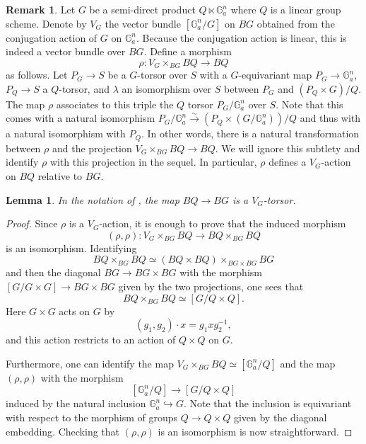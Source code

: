 \documentclass[12pt]{amsart}
\newcommand\Ga{\mathbb{G}_a}
\newtheorem{Lemma}[theorem]{Lemma}
\theoremstyle{definition}
\newtheorem{Rmk}[theorem]{Remark}
\begin{document}
\begin{Rmk}\label{rem: V-torsor for semidirect product}
    Let $G$ be a semi-direct product $Q\ltimes\Ga^n$ where $Q$ is a linear group scheme.
    Denote by $V_G$ the vector bundle $[\Ga^n/G]$ on $BG$ obtained from the conjugation action of $G$ on $\Ga^n$. Because the conjugation action is linear, this is indeed a vector bundle over $BG$. Define a morphism
    \[
        \rho: V_G \times_{BG}BQ \longrightarrow BQ
    \]
    as follows. Let $P_G\rightarrow S$ be a $G$-torsor over $S$ with a $G$-equivariant map $P_G\rightarrow\Ga^n$, $P_Q\rightarrow S$ a $Q$-torsor, and $\lambda$ an isomorphism over $S$ between $P_G$ and $(P_Q \times G )/Q$. The map $\rho$ associates to this triple the $Q$ torsor $P_G/\Ga^n$ over $S$. Note that this comes with a natural isomorphism $P_G/\Ga^n \xrightarrow{\sim} (P_Q \times (G/\Ga^n))/Q$ and thus with a natural isomorphism with $P_Q$. In other words, there is a natural transformation between $\rho$ and the projection  $ V_G \times_{BG}BQ \longrightarrow BQ$. We will ignore this subtlety and identify $\rho$ with this projection in the sequel. In particular, $\rho$ defines a $V_G$-action on $BQ$ relative to $BG$.
\end{Rmk}
\begin{Lemma}\label{lem: V-torsor for semidirect product}
    In the notation of , the map $BQ\rightarrow BG$ is a $V_G$-torsor.
\end{Lemma}
\begin{proof}
     Since $\rho$ is a $V_G$-action, it is enough to prove that the induced morphism 
    $$ (\rho,\rho):V_G \times_{BG} BQ \longrightarrow BQ\times_{BG}BQ$$
    is an isomorphism. Identifying  
    $$
    BQ \times_{BG} BQ \simeq (BQ \times BQ) \times_{BG \times BG} BG
    $$
    and then the diagonal $BG \to BG \times BG$ with the morphism $[G/G \times G] \to BG \times BG$ given by the two projections, one sees that 
    $$
    BQ \times_{BG} BQ \simeq  [G/Q \times Q].
    $$
    Here $G\times G$ acts on $G$ by
    \[
        (g_1,g_2)\cdot x = g_1xg_2^{-1},
    \]
    and this action restricts to an action of $Q\times Q$ on $G$.

    Furthermore, one can identify the map $  V_G \times_{BG}BQ \simeq [\Ga^n/Q]$ and the map $(\rho,\rho)$ with the morphism
    $$
    [\Ga^n/Q] \longrightarrow [G/ Q\times Q]
    $$
    induced by the natural inclusion $\Ga^n \hookrightarrow G$. Note that the inclusion is equivariant with respect to the morphism of groups $Q\rightarrow Q\times Q$ given by the diagonal embedding. Checking that $(\rho,\rho)$ is an isomorphism is now straightforward.
\end{proof}
\end{document}
